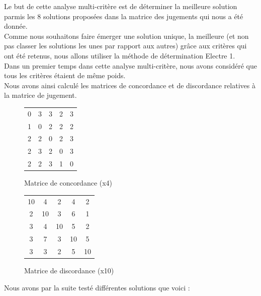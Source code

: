 Le but de cette analyse multi-critère est de déterminer la meilleure solution
parmis les 8 solutions proposées dans la matrice des jugements qui nous a été
donnée. \\

Comme nous souhaitons faire émerger une solution unique, la meilleure (et non
pas classer les solutions les unes par rapport aux autres) grâce aux critères
qui ont été retenus, nous allons utiliser la méthode de détermination Electre
1. \\

Dans un premier temps dans cette analyse multi-critère, nous avons considéré
que tous les critères étaient de même poids. \\

Nous avons ainsi calculé les matrices de concordance et de discordance
relatives à la matrice de jugement. \\
\begin{figure}
    \begin{center}
        \begin{tabular}{|c c c c c|}
            0&3&3&2&3\\
            1&0&2&2&2\\
            2&2&0&2&3\\
            2&3&2&0&3\\
            2&2&3&1&0\\
        \end{tabular}
        \caption{Matrice de concordance (x4)}
    \end{center}
\end{figure}

\begin{figure}
    \begin{center}
        \begin{tabular}{|c c c c c|}
            10&4&2&4&2\\
            2&10&3&6&1\\
            3&4&10&5&2\\
            3&7&3&10&5\\
            3&3&2&5&10\\
        \end{tabular}
        \caption{Matrice de discordance (x10)}
    \end{center}
\end{figure}

Nous avons par la suite testé différentes solutions que voici : \\

